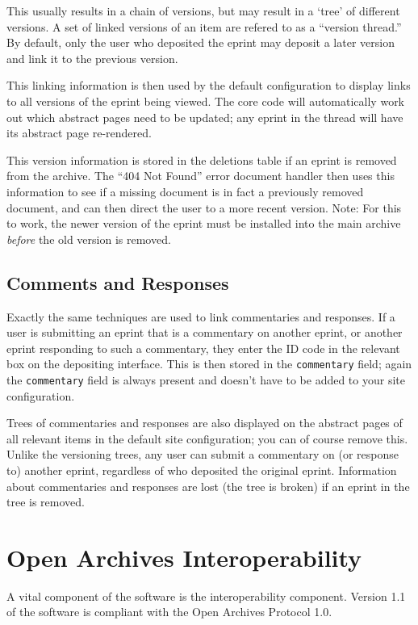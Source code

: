 This usually results in a chain of versions, but may result in a `tree' of different versions. A set of linked versions of an item are refered to as a ``version thread.'' By default, only the user who deposited the eprint may deposit a later version and link it to the previous version.

This linking information is then used by the default configuration to display links to all versions of the eprint being viewed. The core code will automatically work out which abstract pages need to be updated; any eprint in the thread will have its abstract page re-rendered.

This version information is stored in the deletions table if an eprint is removed from the archive. The ``404 Not Found'' error document handler then uses this information to see if a missing document is in fact a previously removed document, and can then direct the user to a more recent version. Note: For this to work, the newer version of the eprint must be installed into the main archive \emph{before} the old version is removed.


\subsection{Comments and Responses}

Exactly the same techniques are used to link commentaries and responses. If a user is submitting an eprint that is a commentary on another eprint, or another eprint responding to such a commentary, they enter the ID code in the relevant box on the depositing interface. This is then stored in the {\tt commentary} field; again the {\tt commentary} field is always present and doesn't have to be added to your site configuration.

Trees of commentaries and responses are also displayed on the abstract pages of all relevant items in the default site configuration; you can of course remove this. Unlike the versioning trees, any user can submit a commentary on (or response to) another eprint, regardless of who deposited the original eprint. Information about commentaries and responses are lost (the tree is broken) if an eprint in the tree is removed.


\section{Open Archives Interoperability}

A vital component of the software is the interoperability component. Version 1.1 of the software is compliant with
the Open Archives Protocol 1.0.

